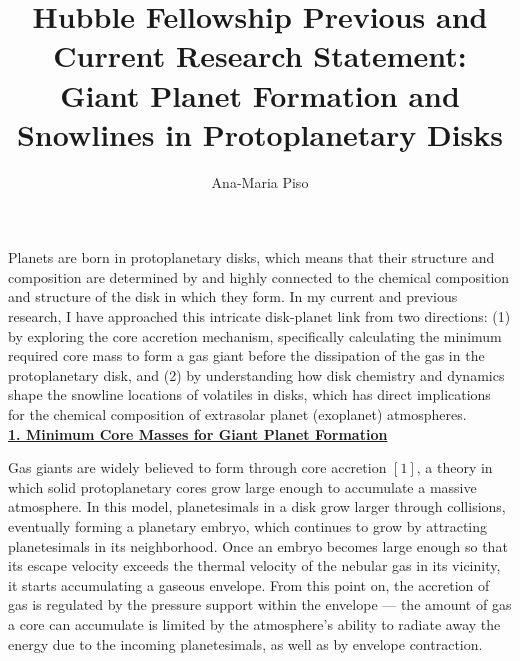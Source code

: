 \documentclass[12pt, letterpaper]{article}
\date{}
\title{\Large Hubble Fellowship Previous and Current Research Statement: \\
Giant Planet Formation and Snowlines in Protoplanetary Disks\vspace{-2ex}}
\author{Ana-Maria Piso \vspace{-2ex}}
\begin{document}
\maketitle


\vspace{-1.5cm}


Planets are born in protoplanetary disks, which means that their structure and composition are determined by and highly connected to the chemical composition and structure of the disk in which they form. In my current and previous research, I have approached this intricate disk-planet link from two directions: (1) by exploring the core accretion mechanism, specifically calculating the minimum required core mass to form a gas giant before the dissipation of the gas in the protoplanetary disk, and (2) by understanding how disk chemistry and dynamics shape the snowline locations of volatiles in disks, which has direct implications for the chemical composition of extrasolar planet (exoplanet) atmospheres. \\
\underline{\textbf{1. Minimum Core Masses for Giant Planet Formation}}

Gas giants are widely believed to form through core accretion $[1]$, a theory in which solid protoplanetary cores grow large enough to accumulate a massive atmosphere. In this model, planetesimals in a disk grow larger through collisions, eventually forming a planetary embryo, which continues to grow by attracting planetesimals in its neighborhood. Once an embryo becomes large enough so that its escape velocity exceeds the thermal velocity of the nebular gas in its vicinity, it starts accumulating a gaseous envelope. From this point on, the accretion of gas is regulated by the pressure support within the envelope --- the amount of gas a core can accumulate is limited by the atmosphere's ability to radiate away the energy due to the incoming planetesimals, as well as by envelope contraction.  
\end{document}
